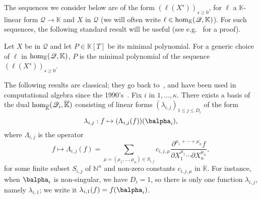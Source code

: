 \documentclass[12pt]{article}
\newcommand{\lf}{X}
\newcommand{\residueI}{\mathscr{Q}}
\def\dg{\kappa}
\def\N {\ensuremath{\mathbb{N}}}
\def\K{\mathbb{K}}
\def\K {\ensuremath{\mathbb{K}}}
\def\Kbar {{\ensuremath{\overline{\mathbb{K}}}}}
\def\D {\ensuremath{D}}
\begin{document}
The sequences we consider below are of the form $(\ell(\lf^s))_{s \ge
  0}$, for $\ell$ a $\K$-linear form $\residueI \to \K$ and $\lf$ in $\residueI$
(we will often write $\ell \in {\rm hom}_\K(\residueI,\K)$). For
such sequences, the following standard result will be useful
(see e.g.~\cite[Proposition~1 \& 2]{BoSaSc03} for a proof).
\begin{lemma}\label{lemma:minpoly}
  Let $\lf$ be in $\residueI$ and let $P \in \K[T]$ be its minimal
  polynomial. For a generic choice of $\ell$ in ${\rm hom}_\K(\residueI,\K)$,
  $P$ is the minimal polynomial of the sequence $(\ell(\lf^s))_{s \ge
    0}$.
\end{lemma}

The following results are classical; they go back
to~\cite{Macaulay16}, and have been used in computational algebra
since the 1990's~\cite{MaMoMo96,Mourrain97}. Fix $i$ in $1,\dots,\dg$.
There exists a basis of the dual ${\rm hom}_\Kbar(\residueI_i,\Kbar)$
consisting of linear forms $(\lambda_{i,j})_{1\le j \le \D_i}$ of the
form
$$\lambda_{i,j}: f \mapsto (\Lambda_{i,j}(f))(\balpha_i),$$
where $\Lambda_{i,j}$ is the operator
$$f \mapsto \Lambda_{i,j}(f) = \sum_{\mu=(\mu_1,\dots,\mu_n) \in
	S_{i,j}} c_{i,j,\mu} \frac{ \partial^{\mu_1 + \cdots + \mu_n} f}
{\partial X_1^{\mu_1} \cdots \partial X_n^{\mu_n}},$$ for some finite
subset $S_{i,j}$ of $\N^n$ and non-zero constants $c_{i,j,\mu}$ in
$\Kbar$. 
For instance, when $\balpha_i$ is non-singular, we have $D_i=1$, so
there is only one function $\lambda_{i,j}$, namely $\lambda_{i,1}$; we
write it $\lambda_{i,1}(f) = f(\balpha_i)$.
\end{document}
